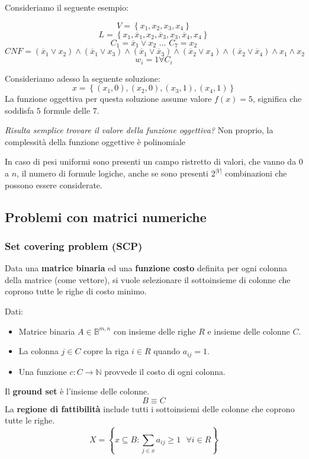 \documentclass{article}
\begin{document}
Consideriamo il seguente esempio:

$$V=\left\{x_1,x_2,x_3,x_4\right\}$$
$$L=\left\{x_1, \overline{x}_1, x_2, \overline{x}_3, x_3,\overline{x}_4, x_4\right\}$$
$$C_1=\overline{x}_1\lor x_2 \text{ ... } C_7=x_2$$
$$CNF = (\overline{x}_1\lor x_2 )\land (\overline{x}_1\lor x_3 )\land (\overline{x}_1\lor \overline{x}_3 )\land (\overline{x}_2\lor x_4 )\land (\overline{x}_2\lor \overline{x}_4 )\land x_1\land x_2$$
$$w_i=1 \forall C_i$$

Consideriamo adesso la seguente soluzione:
$$x=\left\{(x_1,0),(x_2,0),(x_3,1 ),(x_4,1)\right\}$$
La funzione oggettiva per questa soluzione assume valore $f(x)=5$, significa che soddisfa
$5$ formule delle $7$.

\textit{Risulta semplice trovare il valore della funzione oggettiva?} Non proprio, la complessità
della funzione oggettive è polinomiale

In caso di pesi uniformi sono presenti un campo ristretto di valori, che vanno da $0$ a $n$,
il numero di formule logiche, anche se sono presenti $2^|V|$ combinazioni che possono essere considerate.

\subsection{Problemi con matrici numeriche}
\subsubsection{Set covering problem (SCP)}
Data una \textbf{matrice binaria} ed una \textbf{funzione costo} definita per ogni
colonna della matrice (come vettore), si vuole selezionare il sottoinsieme di
colonne che coprono tutte le righe di costo minimo.

Dati:
\begin{itemize}
    \item Matrice binaria $A\in\mathbb{B}^{m,n}$ con insieme delle righe $R$ e insieme delle colonne $C$.
    \item La colonna $j\in C$ copre la riga $i\in R$ quando $a_{ij}=1$.
    \item Una funzione $c:C\rightarrow\mathbb{N}$ provvede il costo di ogni colonna.
\end{itemize}

Il \textbf{ground set} è l'insieme delle colonne.
$$B\equiv C$$
La \textbf{regione di fattibilità} include tutti i sottoinsiemi delle colonne che coprono
tutte le righe.
$$X=\left\{x\subseteq B : \sum_{j\in x}a_{ij}\geq 1 \text{ }\forall i \in R\right\}$$
\end{document}
